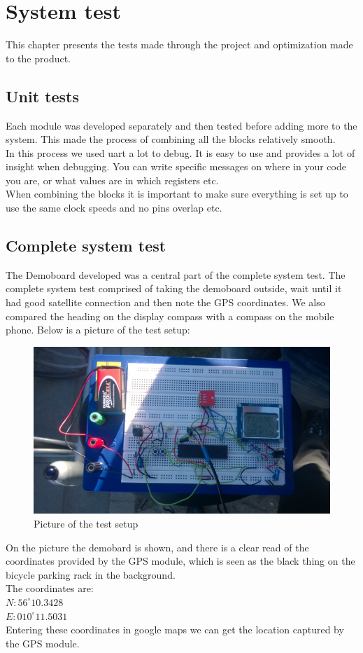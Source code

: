 \chapter{System test}
This chapter presents the tests made through the project and optimization made to the product.

\section{Unit tests}
Each module was developed separately and then tested before adding more to the system. This made the process of combining all the blocks relatively smooth.\\
In this process we used uart a lot to debug. It is easy to use and provides a lot of insight when debugging. You can write specific messages on where in your code you are, or what values are in which registers etc.\\
When combining the blocks it is important to make sure everything is set up to use the same clock speeds and no pins overlap etc.

\section{Complete system test}
The Demoboard developed was a central part of the complete system test. The complete system test comprised of taking the demoboard outside, wait until it had good satellite connection and then note the GPS coordinates. We also compared the heading on the display compass with a compass on the mobile phone. Below is a picture of the test setup:
\begin{figure}[H]
\centering
\includegraphics[width=.8\textwidth]{billeder/test_setup}
\caption{Picture of the test setup}
\end{figure}
On the picture the demobard is shown, and there is a clear read of the coordinates provided by the GPS module, which is seen as the black thing on the bicycle parking rack in the background.\\
The coordinates are:\\
$N:56^{\circ}10.3428$\\
$E:010^{\circ}11.5031$\\
Entering these coordinates in google maps we can get the location captured by the GPS module.

